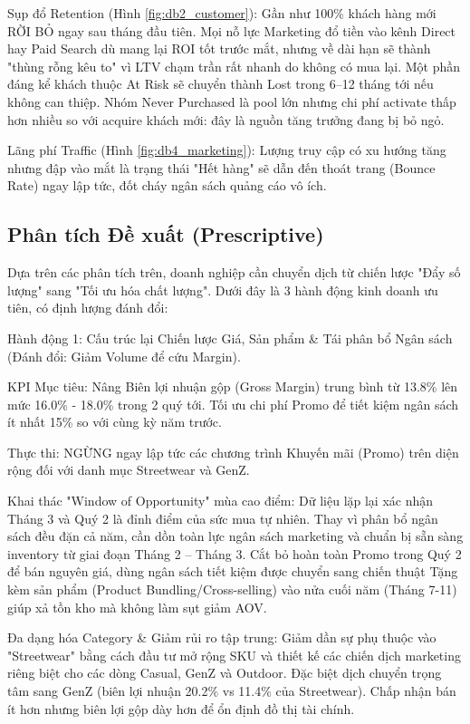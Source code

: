 \documentclass{article}
\begin{document}
Sụp đổ Retention (Hình \ref{fig:db2_customer}): Gần như 100\% khách hàng mới RỜI BỎ ngay sau tháng đầu tiên. Mọi nỗ lực Marketing đổ tiền vào kênh Direct hay Paid Search dù mang lại ROI tốt trước mắt, nhưng về dài hạn sẽ thành "thùng rỗng kêu to" vì LTV chạm trần rất nhanh do không có mua lại. Một phần đáng kể khách thuộc At Risk sẽ chuyển thành Lost trong 6–12 tháng tới nếu không can thiệp. Nhóm Never Purchased là pool lớn nhưng chi phí activate thấp hơn nhiều so với acquire khách mới: đây là nguồn tăng trưởng đang bị bỏ ngỏ.

Lãng phí Traffic (Hình \ref{fig:db4_marketing}): Lượng truy cập có xu hướng tăng nhưng đập vào mắt là trạng thái "Hết hàng" sẽ dẫn đến thoát trang (Bounce Rate) ngay lập tức, đốt cháy ngân sách quảng cáo vô ích.

\subsection{Phân tích Đề xuất (Prescriptive)}

Dựa trên các phân tích trên, doanh nghiệp cần chuyển dịch từ chiến lược "Đẩy số lượng" sang "Tối ưu hóa chất lượng". Dưới đây là 3 hành động kinh doanh ưu tiên, có định lượng đánh đổi:

Hành động 1: Cấu trúc lại Chiến lược Giá, Sản phẩm \& Tái phân bổ Ngân sách (Đánh đổi: Giảm Volume để cứu Margin).

KPI Mục tiêu: Nâng Biên lợi nhuận gộp (Gross Margin) trung bình từ 13.8\% lên mức 16.0\% - 18.0\% trong 2 quý tới. Tối ưu chi phí Promo để tiết kiệm ngân sách ít nhất 15\% so với cùng kỳ năm trước.

Thực thi: NGỪNG ngay lập tức các chương trình Khuyến mãi (Promo) trên diện rộng đối với danh mục Streetwear và GenZ.

Khai thác "Window of Opportunity" mùa cao điểm: Dữ liệu lặp lại xác nhận Tháng 3 và Quý 2 là đỉnh điểm của sức mua tự nhiên. Thay vì phân bổ ngân sách đều đặn cả năm, cần dồn toàn lực ngân sách marketing và chuẩn bị sẵn sàng inventory từ giai đoạn Tháng 2 – Tháng 3. Cắt bỏ hoàn toàn Promo trong Quý 2 để bán nguyên giá, dùng ngân sách tiết kiệm được chuyển sang chiến thuật Tặng kèm sản phẩm (Product Bundling/Cross-selling) vào nửa cuối năm (Tháng 7-11) giúp xả tồn kho mà không làm sụt giảm AOV.

Đa dạng hóa Category \& Giảm rủi ro tập trung: Giảm dần sự phụ thuộc vào "Streetwear" bằng cách đầu tư mở rộng SKU và thiết kế các chiến dịch marketing riêng biệt cho các dòng Casual, GenZ và Outdoor. Đặc biệt dịch chuyển trọng tâm sang GenZ (biên lợi nhuận 20.2\% vs 11.4\% của Streetwear). Chấp nhận bán ít hơn nhưng biên lợi gộp dày hơn để ổn định đồ thị tài chính.
\end{document}
